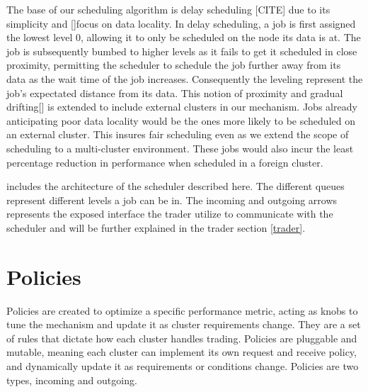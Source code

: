 The base of our scheduling algorithm is delay scheduling [CITE] due to its
simplicity and []focus on data locality. In delay scheduling, a job is first
assigned the lowest level 0, allowing it to only be scheduled on the node its
data is at. The job is subsequently bumbed to higher levels as it fails to get
it scheduled in close proximity, permitting the scheduler to schedule the job
further away from its data as the wait time of the job increases. Consequently
the leveling represent the job's expectated distance from its data. This notion
of proximity and gradual drifting[] is extended to include external clusters in
our mechanism. Jobs already anticipating poor data locality would be the ones
more likely to be scheduled on an external cluster. This insures fair
scheduling even as we extend the scope of scheduling to a multi-cluster
environment. These jobs would also incur the least percentage reduction in
performance when scheduled in a foreign cluster.

 includes the architecture of the scheduler described here. The
different queues represent different levels a job can be in. The incoming and
outgoing arrows represents the exposed interface the trader utilize to
communicate with the scheduler and will be further explained in the trader
section \ref{trader}. 





\section{Policies}

Policies are created to optimize a specific performance metric, acting as knobs
to tune the mechanism and update it as cluster requirements change. They are a
set of rules that dictate how each cluster handles trading. Policies are
pluggable and mutable, meaning each cluster can implement its own request and
receive policy, and dynamically update it as requirements or conditions change.
Policies are two types, incoming and outgoing. 


